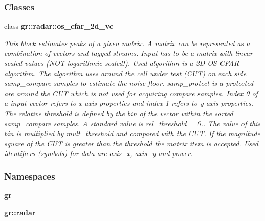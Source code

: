 \subsubsection*{Classes}
\begin{DoxyCompactItemize}
\item 
class {\bf gr\+::radar\+::os\+\_\+cfar\+\_\+2d\+\_\+vc}
\begin{DoxyCompactList}\small\item\em This block estimates peaks of a given matrix. A matrix can be represented as a combination of vectors and tagged streams. Input has to be a matrix with linear scaled values (N\+OT logarithmic scaled!). Used algorithm is a 2D O\+S-\/\+C\+F\+AR algorithm. The algorithm uses around the cell under test (C\+UT) on each side samp\+\_\+compare samples to estimate the noise floor. samp\+\_\+protect is a protected are around the C\+UT which is not used for acquiring compare samples. Index 0 of a input vector refers to x axis properties and index 1 refers to y axis properties. The relative threshold is defined by the bin of the vector within the sorted samp\+\_\+compare samples. A standard value is rel\+\_\+threshold = 0.. The value of this bin is multiplied by mult\+\_\+threshold and compared with the C\+UT. If the magnitude square of the C\+UT is greater than the threshold the matrix item is accepted. Used identifiers (symbols) for data are \textquotesingle{}axis\+\_\+x\textquotesingle{}, \textquotesingle{}axis\+\_\+y\textquotesingle{} and \textquotesingle{}power\textquotesingle{}. \end{DoxyCompactList}\end{DoxyCompactItemize}
\subsubsection*{Namespaces}
\begin{DoxyCompactItemize}
\item 
 {\bf gr}
\item 
 {\bf gr\+::radar}
\end{DoxyCompactItemize}
